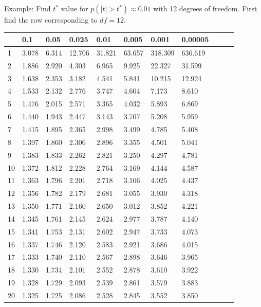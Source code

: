 \begin{frame}{\small Example: Find $t^*$ value for $p(|t|>t^*)
\approx 0.01$ with 12 degrees of freedom.}
{\tiny First find the row corresponding to $df=12$.}

  {
\fontsize{5pt}{5pt}
\selectfont

\begin{tabular}{l|llllllllll}
 & 0.1&0.05&0.025&0.01&0.005&0.001&0.00005\\ \hline
 1 & 3.078 & 6.314 & 12.706 & 31.821 & 63.657 & 318.309 & 636.619 \\ 
 2 & 1.886 & 2.920 & 4.303 & 6.965 & 9.925 & 22.327 & 31.599 \\ 
 3 & 1.638 & 2.353 & 3.182 & 4.541 & 5.841 & 10.215 & 12.924 \\ 
 4 & 1.533 & 2.132 & 2.776 & 3.747 & 4.604 & 7.173 & 8.610 \\ 
 5 & 1.476 & 2.015 & 2.571 & 3.365 & 4.032 & 5.893 & 6.869 \\ 
[5pt]
 6 & 1.440 & 1.943 & 2.447 & 3.143 & 3.707 & 5.208 & 5.959 \\ 
 7 & 1.415 & 1.895 & 2.365 & 2.998 & 3.499 & 4.785 & 5.408 \\ 
 8 & 1.397 & 1.860 & 2.306 & 2.896 & 3.355 & 4.501 & 5.041 \\ 
 9 & 1.383 & 1.833 & 2.262 & 2.821 & 3.250 & 4.297 & 4.781 \\ 
10 & 1.372 & 1.812 & 2.228 & 2.764 & 3.169 & 4.144 & 4.587 \\ 
[5pt]
11 & 1.363 & 1.796 & 2.201 & 2.718 & 3.106 & 4.025 & 4.437 \\ 
\rowcolor{red}12 & 1.356 & 1.782 & 2.179 & 2.681 & 3.055 & 3.930 & 4.318 \\ 
13 & 1.350 & 1.771 & 2.160 & 2.650 & 3.012 & 3.852 & 4.221 \\ 
14 & 1.345 & 1.761 & 2.145 & 2.624 & 2.977 & 3.787 & 4.140 \\ 
15 & 1.341 & 1.753 & 2.131 & 2.602 & 2.947 & 3.733 & 4.073 \\ 
[5pt]
16 & 1.337 & 1.746 & 2.120 & 2.583 & 2.921 & 3.686 & 4.015 \\ 
17 & 1.333 & 1.740 & 2.110 & 2.567 & 2.898 & 3.646 & 3.965 \\ 
18 & 1.330 & 1.734 & 2.101 & 2.552 & 2.878 & 3.610 & 3.922 \\ 
19 & 1.328 & 1.729 & 2.093 & 2.539 & 2.861 & 3.579 & 3.883 \\ 
20 & 1.325 & 1.725 & 2.086 & 2.528 & 2.845 & 3.552 & 3.850 \\ 

\end{tabular}}
\end{frame}
